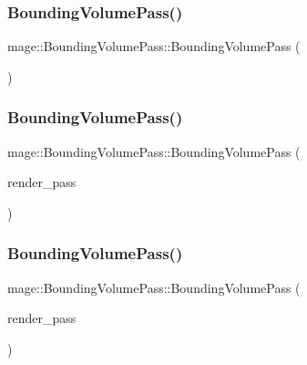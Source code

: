 \subsubsection{\texorpdfstring{Bounding\+Volume\+Pass()}{BoundingVolumePass()}\hspace{0.1cm}{\footnotesize\ttfamily [1/3]}}
{\footnotesize\ttfamily mage\+::\+Bounding\+Volume\+Pass\+::\+Bounding\+Volume\+Pass (\begin{DoxyParamCaption}{ }\end{DoxyParamCaption})}

\hypertarget{classmage_1_1_bounding_volume_pass_a21408cc53051c9c6d94efe41b3bea404}{}\label{classmage_1_1_bounding_volume_pass_a21408cc53051c9c6d94efe41b3bea404} 
\subsubsection{\texorpdfstring{Bounding\+Volume\+Pass()}{BoundingVolumePass()}\hspace{0.1cm}{\footnotesize\ttfamily [2/3]}}
{\footnotesize\ttfamily mage\+::\+Bounding\+Volume\+Pass\+::\+Bounding\+Volume\+Pass (\begin{DoxyParamCaption}\item[{const \hyperlink{classmage_1_1_bounding_volume_pass}{Bounding\+Volume\+Pass} \&}]{render\+\_\+pass }\end{DoxyParamCaption})\hspace{0.3cm}{\ttfamily [delete]}}

\hypertarget{classmage_1_1_bounding_volume_pass_a4c40fde630e6ff9bf466293c7bc94157}{}\label{classmage_1_1_bounding_volume_pass_a4c40fde630e6ff9bf466293c7bc94157} 
\subsubsection{\texorpdfstring{Bounding\+Volume\+Pass()}{BoundingVolumePass()}\hspace{0.1cm}{\footnotesize\ttfamily [3/3]}}
{\footnotesize\ttfamily mage\+::\+Bounding\+Volume\+Pass\+::\+Bounding\+Volume\+Pass (\begin{DoxyParamCaption}\item[{\hyperlink{classmage_1_1_bounding_volume_pass}{Bounding\+Volume\+Pass} \&\&}]{render\+\_\+pass }\end{DoxyParamCaption})\hspace{0.3cm}{\ttfamily [default]}}

